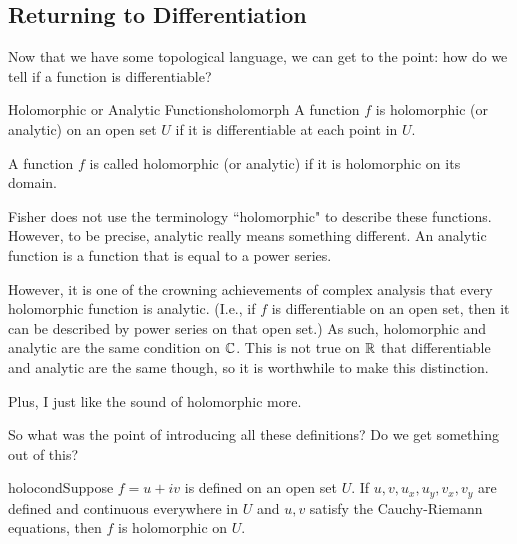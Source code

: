 \subsection{Returning to Differentiation}

Now that we have some topological language, we can get to the point: how do we tell if a function is differentiable?

\begin{defbo}{Holomorphic or Analytic Functions}{holomorph}
A function $f$ is holomorphic (or analytic) on an open set $U$ if it is differentiable at each point in $U$.

A function $f$ is called holomorphic (or analytic) if it is holomorphic on its domain.
\end{defbo}

\begin{note} Fisher does not use the terminology ``holomorphic" to describe these functions. However, to be precise, analytic really means something different. An analytic function is a function that is equal to a power series.

However, it is one of the crowning achievements of complex analysis that every holomorphic function is analytic. (I.e., if $f$ is differentiable on an open set, then it can be described by power series on that open set.) As such, holomorphic and analytic are the same condition on $\mathbb{C}$. This is not true on $\mathbb{R}$ that differentiable and analytic are the same though, so it is worthwhile to make this distinction.

Plus, I just like the sound of holomorphic more.
\end{note}

So what was the point of introducing all these definitions? Do we get something out of this?

\begin{thmbo}{}{holocond}Suppose $f = u + iv$ is defined on an open set $U$. If $u,v, u_x, u_y, v_x, v_y$ are defined and continuous everywhere in $U$ and $u,v$ satisfy the Cauchy-Riemann equations, then $f$ is holomorphic on $U$.
\end{thmbo}

